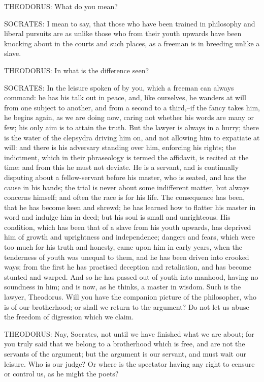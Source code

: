 THEODORUS: What do you mean?

SOCRATES: I mean to say, that those who have been trained in philosophy
and liberal pursuits are as unlike those who from their youth upwards
have been knocking about in the courts and such places, as a freeman is
in breeding unlike a slave.

THEODORUS: In what is the difference seen?

SOCRATES: In the leisure spoken of by you, which a freeman can always
command: he has his talk out in peace, and, like ourselves, he wanders
at will from one subject to another, and from a second to a third,--if
the fancy takes him, he begins again, as we are doing now, caring not
whether his words are many or few; his only aim is to attain the truth.
But the lawyer is always in a hurry; there is the water of the clepsydra
driving him on, and not allowing him to expatiate at will: and there is
his adversary standing over him, enforcing his rights; the indictment,
which in their phraseology is termed the affidavit, is recited at
the time: and from this he must not deviate. He is a servant, and is
continually disputing about a fellow-servant before his master, who is
seated, and has the cause in his hands; the trial is never about some
indifferent matter, but always concerns himself; and often the race
is for his life. The consequence has been, that he has become keen and
shrewd; he has learned how to flatter his master in word and indulge him
in deed; but his soul is small and unrighteous. His condition, which has
been that of a slave from his youth upwards, has deprived him of growth
and uprightness and independence; dangers and fears, which were too
much for his truth and honesty, came upon him in early years, when the
tenderness of youth was unequal to them, and he has been driven into
crooked ways; from the first he has practised deception and retaliation,
and has become stunted and warped. And so he has passed out of youth
into manhood, having no soundness in him; and is now, as he thinks,
a master in wisdom. Such is the lawyer, Theodorus. Will you have the
companion picture of the philosopher, who is of our brotherhood; or
shall we return to the argument? Do not let us abuse the freedom of
digression which we claim.

THEODORUS: Nay, Socrates, not until we have finished what we are about;
for you truly said that we belong to a brotherhood which is free, and
are not the servants of the argument; but the argument is our servant,
and must wait our leisure. Who is our judge? Or where is the spectator
having any right to censure or control us, as he might the poets?

